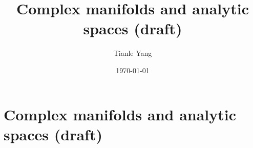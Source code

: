 \documentclass{noteformyself}
\title{Complex manifolds and analytic spaces (draft)}
\author{Tianle Yang}
\date{\today}
\begin{document}
    \maketitle
    \section{Complex manifolds and analytic spaces (draft)}



    

\end{document}
